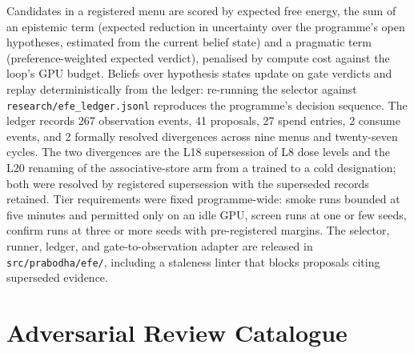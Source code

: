 Candidates in a registered menu are scored by expected free energy, the sum of an epistemic term (expected reduction in uncertainty over the programme's open hypotheses, estimated from the current belief state) and a pragmatic term (preference-weighted expected verdict), penalised by compute cost against the loop's GPU budget. Beliefs over hypothesis states update on gate verdicts and replay deterministically from the ledger: re-running the selector against \texttt{research/efe\_ledger.jsonl} reproduces the programme's decision sequence. The ledger records 267 observation events, 41 proposals, 27 spend entries, 2 consume events, and 2 formally resolved divergences across nine menus and twenty-seven cycles. The two divergences are the L18 supersession of L8 dose levels and the L20 renaming of the associative-store arm from a trained to a cold designation; both were resolved by registered supersession with the superseded records retained. Tier requirements were fixed programme-wide: smoke runs bounded at five minutes and permitted only on an idle GPU, screen runs at one or few seeds, confirm runs at three or more seeds with pre-registered margins. The selector, runner, ledger, and gate-to-observation adapter are released in \texttt{src/prabodha/efe/}, including a staleness linter that blocks proposals citing superseded evidence.

\section{Adversarial Review Catalogue}
\label{app:reviews}

